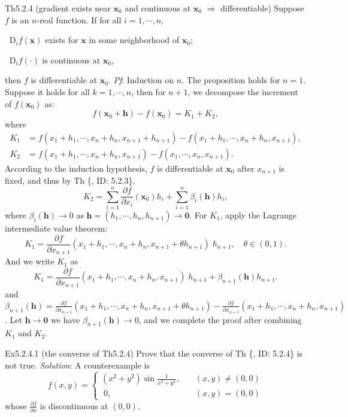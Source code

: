 \documentclass{article}
\newcommand{\parfrac}[2]{\frac{\partial #1}{\partial #2}}
\newcommand{\Dif}{\mathop{}\!\mathrm{D}}
\begin{document}
\begin{Th}{Th5.2.4 (gradient exists near $\pmb{x}_0$ and continuous at $\pmb{x}_0$ $\Rightarrow$ differentiable)}
    Suppose $f$ is an $n$-real function. If for all $i=1,\cdots,n$, 
    \begin{compactenum}
        \item $\Dif_i f(\pmb{x})$ exists for $\pmb{x}$ in some neighborhood of $\pmb{x}_0$;
        \item $\Dif_i f(\cdot)$ is continuous at $\pmb{x}_0$,
    \end{compactenum}
    then $f$ is differentiable at $\pmb{x}_0$.
    \tcblower
    \textit{Pf}: Induction on $n$. The proposition holds for $n=1$. Suppose it holds for all $k=1,\cdots, n$, then for $n+1$, we decompose the increment of $f(\pmb{x}_0)$ as:
    $$ f(\pmb{x}_0 + \pmb{h}) - f(\pmb{x}_0) = K_1 + K_2, $$
    where
    $$
    \begin{aligned}
    K_1 &= f(x_1+h_1, \cdots, x_n+h_n, x_{n+1} + h_{n+1}) - f(x_1+h_1, \cdots, x_n+h_n, x_{n+1}),\\
    K_2 &= f(x_1+h_1, \cdots, x_n+h_n, x_{n+1}) - f(x_1, \cdots, x_n, x_{n+1}).
    \end{aligned}
    $$
    According to the induction hypothesis, $f$ is differentiable at $\pmb{x}_0$ after $x_{n+1}$ is fixed, and thus by Th \{, ID: 5.2.3\}, 
    $$ K_2 = \sum_{i=1}^{n} \parfrac{f}{x_i}(\pmb{x}_0)h_i + \sum_{i=1}^{n} \beta_i (\pmb{h}) h_i, $$
    where $\beta_i(\pmb{h})\rightarrow 0$ as $\pmb{h} = (h_1, \cdots, h_n, h_{n+1})\rightarrow \pmb{0}$.
    For $K_1$, apply the Lagrange intermediate value theorem:
    $$ K_1 = \parfrac{f}{x_{n+1}}(x_1+h_1, \cdots, x_n+h_n, x_{n+1}+\theta h_{n+1})\;h_{n+1},\quad\theta\in (0,1).$$
    And we write $K_1$ as
    $$ K_1 = \parfrac{f}{x_{n+1}}(x_1+h_1, \cdots, x_n+h_n, x_{n+1})\;h_{n+1} + \beta_{n+1}(\pmb{h}) h_{n+1}. $$
    and 
    $\beta_{n+1}(\pmb{h}) = \parfrac{f}{x_{n+1}}(x_1+h_1, \cdots, x_n+h_n, x_{n+1}+\theta h_{n+1}) - \parfrac{f}{x_{n+1}}(x_1+h_1, \cdots, x_n+h_n, x_{n+1})$.
    Let $\pmb{h}\rightarrow \pmb{0}$ we have $\beta_{n+1}(\pmb{h})\rightarrow 0$, and we complete the proof after combining $K_1$ and $K_2$.
\end{Th}

\begin{Th}{Ex5.2.4.1 (the converse of Th5.2.4)}
    Prove that the converse of Th \{, ID: 5.2.4\} is not true.
    \tcblower
    \textit{Solution}: A counterexample is
    $$ f(x,y) = \begin{cases}
        (x^2+y^2)\sin\frac{1}{x^2+y^2},\quad &(x,y)\neq (0,0)\\
        \;0, \quad &(x,y) = (0,0)
    \end{cases}
    $$
    whose $\parfrac{f}{x}$ is discontinuous at $(0,0)$.
\end{Th}
\end{document}
